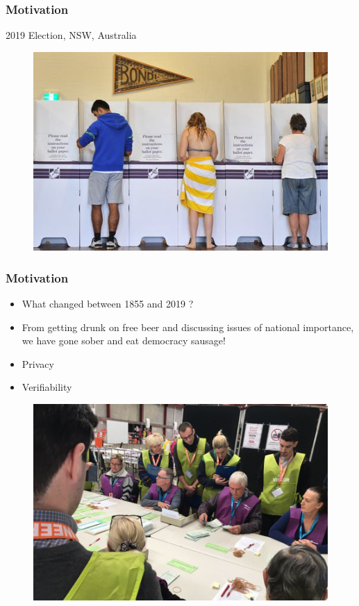 \documentclass{beamer}
\begin{document}
\begin{frame}
\frametitle{Motivation}
{2019 Election, NSW, Australia}
\begin{figure}
	\begin{center}
	\includegraphics[scale=0.50]{image-20160525-25209-cn3ftj.jpg}
	\end{center}
  \end{figure}   
\end{frame}

\begin{frame}
\frametitle{Motivation}
\begin{itemize}
\item What changed between 1855 and 2019 ? \pause
\item From getting drunk on free beer and discussing issues of national 
      importance, we have gone sober and eat democracy sausage! \pause
\item Privacy \pause
\item Verifiability \pause
\end{itemize}
\begin{figure}
	\begin{center}
	\includegraphics[scale=0.15]{scrutneers.jpg}
	\end{center}
  \end{figure}  
\end{frame}
\end{document}
